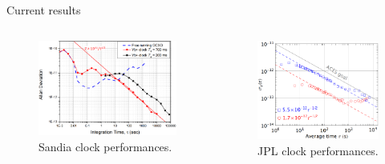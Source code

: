 \begin{frame}{Current results}

    \begin{columns}[c, onlytextwidth]

        \begin{column}{0.5\textwidth}

            \begin{figure}
                \centering
                \includegraphics[height=0.4\textheight]{img/Ytterbium-stability.png}
                \caption{Sandia clock performances\footnotemark[1].}
            \end{figure}

        \end{column}

        \begin{column}{0.5\textwidth}

            \begin{figure}
                \centering
                \includegraphics[height=0.4\textheight]{img/Mercury-stability.png}
                \caption{JPL clock performances\footnotemark[1].}
            \end{figure}


\end{column}
\end{columns}
\end{frame}
